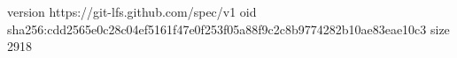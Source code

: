 version https://git-lfs.github.com/spec/v1
oid sha256:cdd2565e0c28c04ef5161f47e0f253f05a88f9c2c8b9774282b10ae83eae10c3
size 2918

